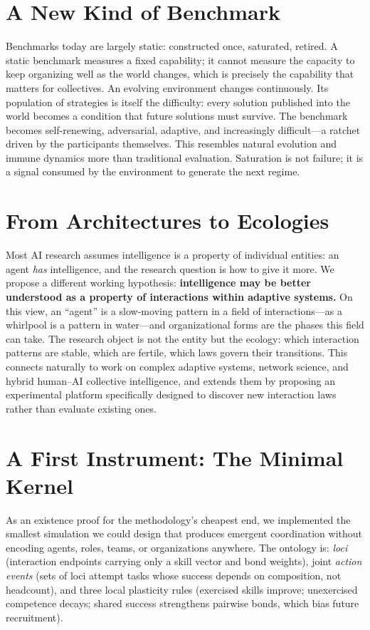 \documentclass{article}
\begin{document}
\section{A New Kind of Benchmark}

Benchmarks today are largely static: constructed once, saturated, retired. A static benchmark measures a fixed capability; it cannot measure the capacity to keep organizing well as the world changes, which is precisely the capability that matters for collectives. An evolving environment changes continuously. Its population of strategies is itself the difficulty: every solution published into the world becomes a condition that future solutions must survive. The benchmark becomes self-renewing, adversarial, adaptive, and increasingly difficult---a ratchet driven by the participants themselves. This resembles natural evolution and immune dynamics more than traditional evaluation. Saturation is not failure; it is a signal consumed by the environment to generate the next regime.

\section{From Architectures to Ecologies}

Most AI research assumes intelligence is a property of individual entities: an agent \emph{has} intelligence, and the research question is how to give it more. We propose a different working hypothesis: \textbf{intelligence may be better understood as a property of interactions within adaptive systems.} On this view, an ``agent'' is a slow-moving pattern in a field of interactions---as a whirlpool is a pattern in water---and organizational forms are the phases this field can take. The research object is not the entity but the ecology: which interaction patterns are stable, which are fertile, which laws govern their transitions. This connects naturally to work on complex adaptive systems, network science, and hybrid human--AI collective intelligence, and extends them by proposing an experimental platform specifically designed to discover new interaction laws rather than evaluate existing ones.

\section{A First Instrument: The Minimal Kernel}

As an existence proof for the methodology's cheapest end, we implemented the smallest simulation we could design that produces emergent coordination without encoding agents, roles, teams, or organizations anywhere. The ontology is: \emph{loci} (interaction endpoints carrying only a skill vector and bond weights), joint \emph{action events} (sets of loci attempt tasks whose success depends on composition, not headcount), and three local plasticity rules (exercised skills improve; unexercised competence decays; shared success strengthens pairwise bonds, which bias future recruitment).
\end{document}
